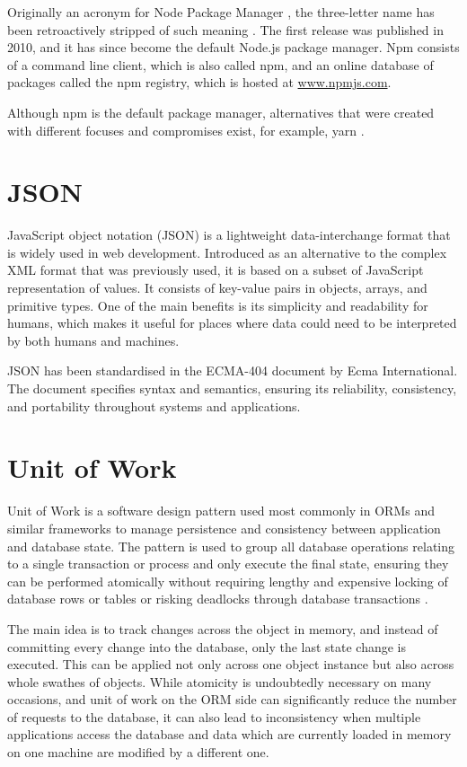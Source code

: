 Originally an acronym for Node Package Manager \cite{npm-old-readme}, the
three-letter name has been retroactively stripped of such meaning
\cite{npm-usage}. The first release was published in 2010, and it has since
become the default Node.js package manager. Npm consists of a command line
client, which is also called npm, and an online database of packages called the
npm registry, which is hosted at \url{www.npmjs.com}. 

Although npm is the default package manager, alternatives that were created with
different focuses and compromises exist, for example, yarn \cite{Yarn}.

\section*{JSON}
JavaScript object notation (JSON) is a lightweight data-interchange format that
is widely used in web development. Introduced as an alternative to the complex
XML format that was previously used, it is based on a subset of JavaScript
representation of values. It consists of key-value pairs in objects, arrays, and
primitive types. One of the main benefits is its simplicity and readability for
humans, which makes it useful for places where data could need to be interpreted
by both humans and machines.

JSON has been standardised in the ECMA-404 \cite{ECMA-404} document by Ecma
International. The document specifies syntax and semantics, ensuring its
reliability, consistency, and portability throughout systems and applications.


\section*{Unit of Work}
Unit of Work is a software design pattern used most commonly in ORMs and similar
frameworks to manage persistence and consistency between application and
database state. The pattern is used to group all database operations relating to
a single transaction or process and only execute the final state, ensuring they
can be performed atomically without requiring lengthy and expensive locking of
database rows or tables or risking deadlocks through database transactions
\cite[p.~184]{fowler-patterns-2003}.

The main idea is to track changes across the object in memory, and instead of
committing every change into the database, only the last state change is
executed. This can be applied not only across one object instance but also
across whole swathes of objects. While atomicity is undoubtedly necessary on
many occasions, and unit of work on the ORM side can significantly reduce the
number of requests to the database, it can also lead to inconsistency when
multiple applications access the database and data which are currently loaded in
memory on one machine are modified by a different one.


